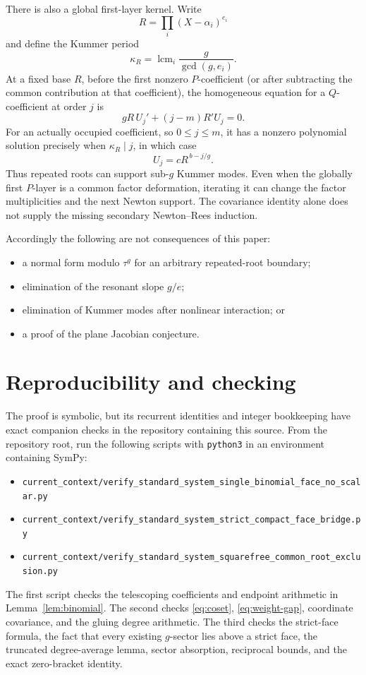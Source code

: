 \documentclass[11pt]{article}
\theoremstyle{definition}
\theoremstyle{remark}
\begin{document}
There is also a global first-layer kernel.  Write
\[
 R=\prod_i(X-\alpha_i)^{e_i}
\]
and define the Kummer period
\[
 \kappa_R
 =\operatorname{lcm}_i\frac{g}{\gcd(g,e_i)}.
\]
At a fixed base \(R\), before the first nonzero \(P\)-coefficient (or
after subtracting the common contribution at that coefficient), the
homogeneous equation for a \(Q\)-coefficient at order \(j\) is
\[
 gR\,U_j'+(j-m)R'U_j=0.
\]
For an actually occupied coefficient, so \(0\leq j\leq m\), it has a
nonzero polynomial solution precisely when \(\kappa_R\mid j\), in which
case
\[
 U_j=cR^{\,b-j/g}.
\]
Thus repeated roots can support sub-\(g\) Kummer modes.  Even when the
globally first \(P\)-layer is a common factor deformation, iterating it
can change the factor multiplicities and the next Newton support.
The covariance identity alone does not supply the missing secondary
Newton--Rees induction.

Accordingly the following are not consequences of this paper:

\begin{itemize}
\item a normal form modulo \(\tau^g\) for an arbitrary repeated-root
  boundary;
\item elimination of the resonant slope \(g/e\);
\item elimination of Kummer modes after nonlinear interaction; or
\item a proof of the plane Jacobian conjecture.
\end{itemize}

\section{Reproducibility and checking}
\label{sec:repro}

The proof is symbolic, but its recurrent identities and integer
bookkeeping have exact companion checks in the repository containing
this source.  From the repository root, run the following scripts with
\texttt{python3} in an environment containing SymPy:
\begingroup\footnotesize
\begin{itemize}
\item \nolinkurl{current_context/verify_standard_system_single_binomial_face_no_scalar.py}
\item \nolinkurl{current_context/verify_standard_system_strict_compact_face_bridge.py}
\item \nolinkurl{current_context/verify_standard_system_squarefree_common_root_exclusion.py}
\end{itemize}
\endgroup
The first script checks the
telescoping coefficients and endpoint arithmetic in
Lemma~\ref{lem:binomial}.  The second checks
\eqref{eq:coset}, \eqref{eq:weight-gap}, coordinate covariance, and
the gluing degree arithmetic.  The third checks the strict-face formula,
the fact that every existing \(g\)-sector lies above a strict face, the
truncated degree-average lemma, sector absorption, reciprocal bounds,
and the exact zero-bracket identity.
\end{document}
